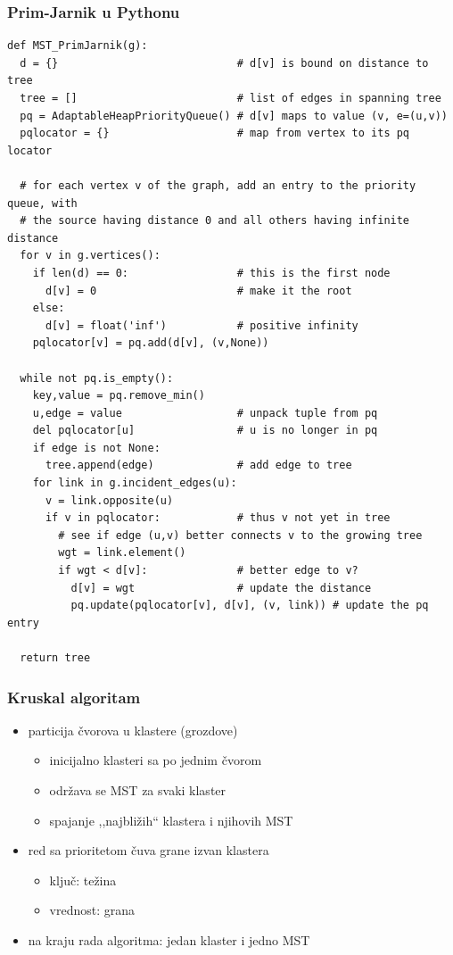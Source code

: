 \documentclass[compress]{beamer}
\begin{document}
\begin{frame}
  \frametitle{Prim-Jarnik u Pythonu}
\begin{verbatim}
def MST_PrimJarnik(g):
  d = {}                            # d[v] is bound on distance to tree
  tree = []                         # list of edges in spanning tree
  pq = AdaptableHeapPriorityQueue() # d[v] maps to value (v, e=(u,v))
  pqlocator = {}                    # map from vertex to its pq locator

  # for each vertex v of the graph, add an entry to the priority queue, with
  # the source having distance 0 and all others having infinite distance
  for v in g.vertices():
    if len(d) == 0:                 # this is the first node
      d[v] = 0                      # make it the root
    else:
      d[v] = float('inf')           # positive infinity
    pqlocator[v] = pq.add(d[v], (v,None))

  while not pq.is_empty():
    key,value = pq.remove_min()
    u,edge = value                  # unpack tuple from pq
    del pqlocator[u]                # u is no longer in pq
    if edge is not None:
      tree.append(edge)             # add edge to tree
    for link in g.incident_edges(u):
      v = link.opposite(u)
      if v in pqlocator:            # thus v not yet in tree
        # see if edge (u,v) better connects v to the growing tree
        wgt = link.element()
        if wgt < d[v]:              # better edge to v?
          d[v] = wgt                # update the distance
          pq.update(pqlocator[v], d[v], (v, link)) # update the pq entry

  return tree
\end{verbatim}
\end{frame}

\begin{frame}[fragile]
  \frametitle{Kruskal algoritam}
  \begin{itemize}
    \item particija čvorova u klastere (grozdove)
    \begin{itemize}
      \item inicijalno klasteri sa po jednim čvorom
      \item održava se MST za svaki klaster
      \item spajanje ,,najbližih`` klastera i njihovih MST
    \end{itemize}
    \item red sa prioritetom čuva grane izvan klastera
    \begin{itemize}
      \item ključ: težina
      \item vrednost: grana
    \end{itemize}
    \item na kraju rada algoritma: jedan klaster i jedno MST
  \end{itemize}
\end{frame}
\end{document}
